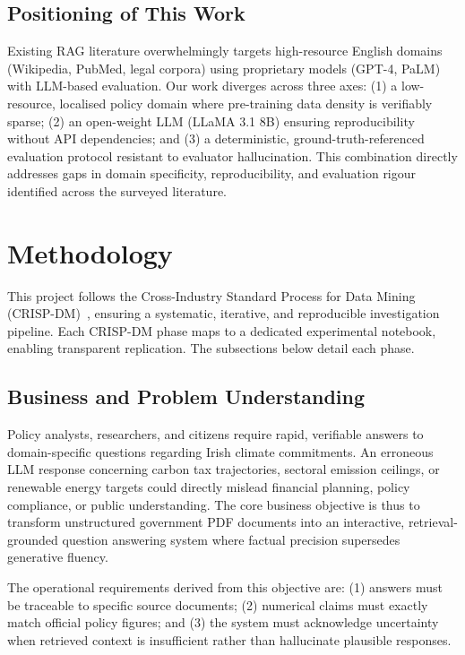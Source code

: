 \documentclass[conference]{IEEEtran}
\begin{document}
\subsection{Positioning of This Work}

Existing RAG literature overwhelmingly targets high-resource English domains (Wikipedia, PubMed, legal corpora) using proprietary models (GPT-4, PaLM) with LLM-based evaluation. Our work diverges across three axes: (1) a low-resource, localised policy domain where pre-training data density is verifiably sparse; (2) an open-weight LLM (LLaMA 3.1 8B) ensuring reproducibility without API dependencies; and (3) a deterministic, ground-truth-referenced evaluation protocol resistant to evaluator hallucination. This combination directly addresses gaps in domain specificity, reproducibility, and evaluation rigour identified across the surveyed literature.

\section{Methodology}

This project follows the Cross-Industry Standard Process for Data Mining (CRISP-DM)~\cite{wirth2000crisp}, ensuring a systematic, iterative, and reproducible investigation pipeline. Each CRISP-DM phase maps to a dedicated experimental notebook, enabling transparent replication. The subsections below detail each phase.

\subsection{Business and Problem Understanding}

Policy analysts, researchers, and citizens require rapid, verifiable answers to domain-specific questions regarding Irish climate commitments. An erroneous LLM response concerning carbon tax trajectories, sectoral emission ceilings, or renewable energy targets could directly mislead financial planning, policy compliance, or public understanding. The core business objective is thus to transform unstructured government PDF documents into an interactive, retrieval-grounded question answering system where factual precision supersedes generative fluency.

The operational requirements derived from this objective are: (1) answers must be traceable to specific source documents; (2) numerical claims must exactly match official policy figures; and (3) the system must acknowledge uncertainty when retrieved context is insufficient rather than hallucinate plausible responses.
\end{document}
